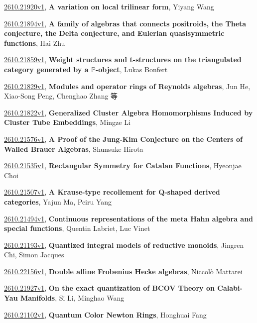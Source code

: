 \documentclass[9pt, a4paper]{article}
\theoremstyle{plain}
\theoremstyle{definition}
\theoremstyle{remark}
\newcommand{\arxiv}[3]{\href{https://arxiv.org/abs/#1}{#1}, \textbf{\textcolor{arxivblue}{#2}}, #3}
\begin{document}
\arxiv{2610.21920v1}{A variation on local trilinear form}{Yiyang Wang}

\arxiv{2610.21894v1}{A family of algebras that connects positroids, the Theta conjecture, the Delta conjecture, and Eulerian quasisymmetric functions}{Hai Zhu}

\arxiv{2610.21859v1}{Weight structures and t-structures on the triangulated category generated by a $\mathbb{P}$-object}{Lukas Bonfert}

\arxiv{2610.21829v1}{Modules and operator rings of Reynolds algebras}{Jun He, Xiao-Song Peng, Chenghao Zhang 等}

\arxiv{2610.21822v1}{Generalized Cluster Algebra Homomorphisms Induced by Cluster Tube Embeddings}{Mingze Li}

\arxiv{2610.21576v1}{A Proof of the Jung-Kim Conjecture on the Centers of Walled Brauer Algebras}{Shunsuke Hirota}

\arxiv{2610.21535v1}{Rectangular Symmetry for Catalan Functions}{Hyeonjae Choi}

\arxiv{2610.21507v1}{A Krause-type recollement for Q-shaped derived categories}{Yajun Ma, Peiru Yang}

\arxiv{2610.21494v1}{Continuous representations of the meta Hahn algebra and special functions}{Quentin Labriet, Luc Vinet}

\arxiv{2610.21193v1}{Quantized integral models of reductive monoids}{Jingren Chi, Simon Jacques}

\arxiv{2610.22156v1}{Double affine Frobenius Hecke algebras}{Niccolò Mattarei}

\arxiv{2610.21927v1}{On the exact quantization of BCOV Theory on Calabi-Yau Manifolds}{Si Li, Minghao Wang}

\arxiv{2610.21102v1}{Quantum Color Newton Rings}{Honghuai Fang}

\end{document}
